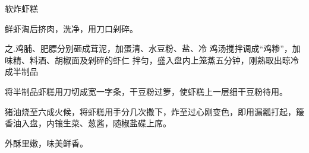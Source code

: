 \begin{recipe}{软炸虾糕}

\ingredients


\cooking

\step 鲜虾淘后挤肉，洗净，用刀口剁碎。

之.鸡脯、肥膘分别砸成茸泥，加蛋清、水豆粉、盐、冷 鸡汤搅拌调成“鸡糁”，加味精、料酒、胡椒面及剁碎的虾仁 拌匀，盛入盘内上笼蒸五分钟，刚熟取出晾冷成半制品

\step 将半制品虾糕用刀切成宽一字条，干豆粉过箩，使虾糕上一层细干豆粉待用。

\step 猪油烧至六成火候，将虾糕用手分几次撒下，炸至过心刚变色，即用漏瓢打起，簸香油入盘，内镶生菜、葱酱，随椒盐碟上席。

\notes

外酥里嫩，味美鲜香。

\end{recipe}

